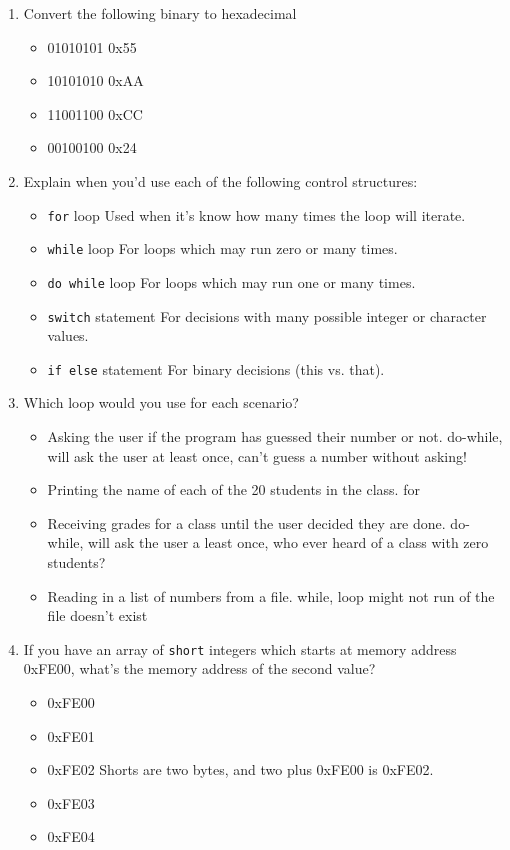 \documentclass[letter,11pt]{article}
\newcommand*\tick{\item[\Checkmark]}
\newcommand*\fail{\item[\XSolidBrush]}
\begin{document}
\begin{enumerate}
    \item Convert the following binary to hexadecimal
    \begin{itemize}
        \item 01010101 {\color{red}0x55}
        \item 10101010 {\color{red}0xAA}
        \item 11001100 {\color{red}0xCC}
        \item 00100100 {\color{red}0x24}
    \end{itemize}
    
    \item Explain when you'd use each of the following control structures:
    \begin{itemize}
        \item \texttt{for} loop {\color{red}Used when it's know how many times the loop will iterate.}
        \item \texttt{while} loop {\color{red}For loops which may run zero or many times.}
        \item \texttt{do while} loop {\color{red}For loops which may run one or many times.}
        \item \texttt{switch} statement {\color{red}For decisions with many possible integer or character values.}
        \item \texttt{if else} statement {\color{red}For binary decisions (this vs. that).}
    \end{itemize}
    
    \item Which loop would you use for each scenario?
    \begin{itemize}
        \item Asking the user if the program has guessed their number or not. {\color{red}do-while, will ask the user at least once, can't guess a number without asking!}
        \item Printing the name of each of the 20 students in the class. {\color{red}for}
        \item Receiving grades for a class until the user decided they are done. {\color{red}do-while, will ask the user a least once, who ever heard of a class with zero students?}
        \item Reading in a list of numbers from a file. {\color{red}while, loop might not run of the file doesn't exist}
    \end{itemize}
    
    \item If you have an array of \texttt{short} integers which starts at memory address 0xFE00, what's the memory address of the second value?
    \begin{itemize}
        \fail 0xFE00
        \fail 0xFE01
        \tick 0xFE02 {\color{red}Shorts are two bytes, and two plus 0xFE00 is 0xFE02.}
        \fail 0xFE03
        \fail 0xFE04
    \end{itemize}
    

\end{enumerate}
\end{document}
